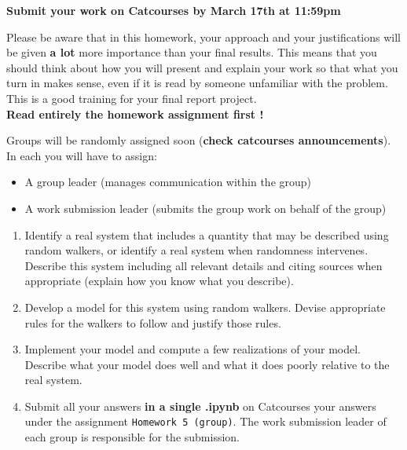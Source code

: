 \documentclass[11pt]{article}
\begin{document}
{\bf Submit your work on Catcourses by March 17th at 11:59pm}

Please be aware that in this homework, your approach and your justifications will be given {\bf a lot} more importance than your final results. This means that you should think about how you will present and explain your work so that what you turn in makes sense, even if it is read by someone unfamiliar with the problem. This is a good training for your final report project.\\
\textbf{Read entirely the homework assignment first !}

Groups will be randomly assigned soon (\textbf{check catcourses announcements}). In each you will have to assign:
\begin{itemize}
\item A group leader (manages communication within the group)
\item A work submission leader (submits the group work on behalf of the group)
\end{itemize}



\begin{enumerate}
 \item Identify a real system that includes a quantity that may be described using random walkers, or identify a real system when randomness intervenes. Describe this system including all relevant details and citing sources when appropriate (explain how you know what you describe).

\item Develop a model for this system using random walkers. Devise appropriate rules for the walkers to follow and justify those rules.

\item Implement your model and compute a few realizations of your model. Describe what your model does well and what it does poorly relative to the real system.

\item Submit all your answers \textbf{in a single .ipynb} on Catcourses your answers under the assignment \texttt{Homework 5 (group)}. The work submission leader of each group is responsible for the submission.
\end{enumerate}
\end{document}
